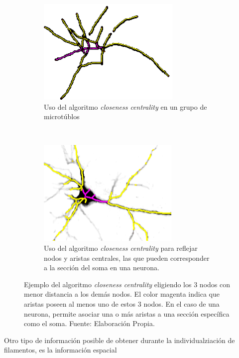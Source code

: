  \begin{figure}[h]
    \centering
    \begin{subfigure}[t]{0.48\textwidth}
        \centering
        \includegraphics[height=2in]{imagenes/50-ROIs-Spinning-Marchantia-somaEdges.png}
        \caption{Uso del algoritmo {\it closeness centrality} en un grupo de microt\'ublos }
        \label{fig:SpinningCenterNodes}
    \end{subfigure}%
    ~ \hspace{0.5cm}
    \begin{subfigure}[t]{0.48\textwidth}
        \centering
        \includegraphics[height=2in]{imagenes/Porta18-3a1-somaEdges.png}
        \caption{Uso del algoritmo {\it closeness centrality} para reflejar nodos y aristas centrales, las que pueden corresponder a la secci\'on del soma en una neurona.}
        \label{fig:Porta18SomaNodes}
    \end{subfigure}

    \caption{Ejemplo del algoritmo {\it closeness centrality} eligiendo los 3 nodos con menor distancia a los dem\'as nodos. El color magenta indica que aristas poseen al menos uno de estos 3 nodos. En el caso de una neurona, permite asociar una o m\'as aristas a una secci\'on espec\'ifica como el soma. Fuente: Elaboraci\'on Propia.}
    \label{fig:ExtraInfoCenterNodes}
\end{figure}

Otro tipo de informaci\'on posible de obtener durante la individualziaci\'on de filamentos, es la informaci\'on espacial

